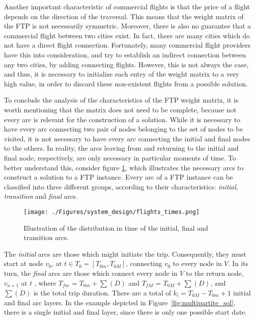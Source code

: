 Another important characteristic of commercial flights is that the price of a flight depends on the direction of the traversal. This means that the weight matrix of the FTP is not necessarily symmetric. Moreover, there is also no guarantee that a commercial flight between two cities exist. In fact, there are many cities which do not have a direct flight connection. Fortunately, many commercial flight providers have this into consideration, and try to establish an indirect connection between any two cities, by adding connecting flights. However, this is not always the case, and thus, it is necessary to initialize each entry of the weight matrix to a very high value, in order to discard these non-existent flights from a possible solution.  

To conclude the analysis of the characteristics of the FTP weight matrix, it is worth mentioning that the matrix does not need to be complete, because not every arc is relevant for the construction of a solution. While it is necessary to have every arc connecting two pair of nodes belonging to the set of nodes to be visited, it is not necessary to have every arc connecting the initial and final nodes to the others. In reality, the arcs leaving from and returning to the initial and final node, respectively, are only necessary in particular moments of time. To better understand this, consider figure \ref{fig:arc_families}, which illustrates the necessary arcs to construct a solution to a FTP instance. Every arc of a FTP instance can be classified into three different groups, according to their characteristics: \textit{initial}, \textit{transition} and \textit{final} arcs.

\begin{figure}[htpb]
  \centering
  \texttt{[image: ./Figures/system\_design/flights\_times.png]}
  \caption{Illustration of the distribution in time of the initial, final and transition arcs.}
  \label{fig:arc_families} 
\end{figure}

The \textit{initial} arcs are those which might initiate the trip. Consequently,
they must start at node $v_0$, at $t \in T_0 = [T_{0m}, T_{0M}]$,
connecting $v_0$ to every node in $V$. In its turn, the \textit{final} arcs are those which connect every node in $V$ to
the return node, $v_{n+1}$ at $t$ \in [$T_{fm}$, $T_{fM}$], where $T_{fm}$ =
$T_{0m} + \sum(D)$ and $T_{fM}$ = $T_{0M} + \sum(D)$, and $\sum(D)$
is the total trip duration. There are a total of $k_i = T_{0M} -
T_{0m} + 1$ initial and final arc layers. In the example
depicted in Figure~\ref{fig:multipartite_sol}, there is a single initial and
final layer, since there is only one possible start date.

